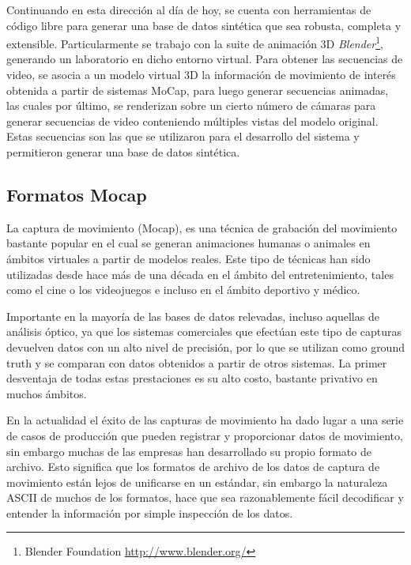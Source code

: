 Continuando en esta dirección al día de hoy, se cuenta con herramientas de código libre para generar una base de datos sintética que sea robusta, completa y extensible. Particularmente se trabajo con la suite de animación 3D \textit{Blender}\footnote{ Blender Foundation \textcolor{blue}{\underline{\url{http://www.blender.org/}}}}, generando un laboratorio en dicho entorno virtual. Para obtener las secuencias de video, se asocia a un modelo  virtual 3D la información de movimiento de interés obtenida a partir de sistemas MoCap, para luego generar secuencias animadas, las cuales por último, se renderizan sobre un cierto número de cámaras para generar secuencias de video conteniendo múltiples vistas del modelo original. Estas secuencias son las que se utilizaron para el desarrollo del sistema y permitieron generar una base de datos sintética. 


\subsection{Formatos Mocap}\label{formatos_MoCap}
La captura de movimiento (Mocap), es una técnica de grabación del movimiento bastante popular en el cual se generan animaciones humanas o animales en ámbitos virtuales a partir de modelos reales. Este tipo de técnicas han sido utilizadas desde hace más de una década en el ámbito del entretenimiento, tales como el cine o los videojuegos e incluso en el ámbito deportivo y médico. 


Importante en la mayoría de las bases de datos relevadas, incluso aquellas de análisis óptico, ya que los sistemas comerciales que efectúan este tipo de capturas devuelven datos con un alto nivel de precisión, por lo que se utilizan como ground truth y se comparan con datos obtenidos a partir de otros sistemas. La primer desventaja de todas estas prestaciones es su alto costo, bastante privativo en muchos ámbitos.

En la actualidad el éxito de las capturas de movimiento ha dado lugar a una serie de casos de producción que pueden registrar y proporcionar datos de movimiento, sin embargo muchas de las empresas han desarrollado su propio formato de archivo. Esto significa que los formatos de archivo de los datos de captura de movimiento
están lejos de unificarse en un estándar, sin embargo la naturaleza ASCII de muchos de los formatos, hace que sea razonablemente fácil decodificar y entender la información por simple inspección de los datos.

